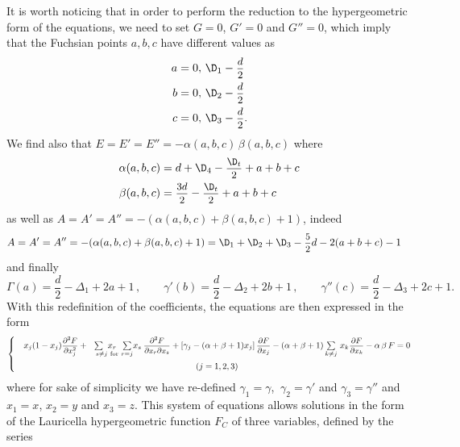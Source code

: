\documentclass[a4paper,11pt,openright,twoside]{book}
\let\a=\alpha   \let\b=\beta   \let\g=\gamma   \let\d=\delta
\newcommand{\sdfrac}[2]{\mbox{\small$\displaystyle\frac{#1}{#2}$}}
\numberwithin{equation}{section}
\begin{document}
{{	It is worth noticing that in order to perform the reduction to the hypergeometric form of the equations, we need to set $G=0$, $G'=0$ and $G''=0$, which imply that the Fuchsian points $a,b,c$ have different values as
	\begin{subequations}
		\begin{align}
			a&=0,\,\D_1-\sdfrac{d}{2}\\
			b&=0,\,\D_2-\sdfrac{d}{2}\\
			c&=0,\,\D_3-\sdfrac{d}{2}.
		\end{align}
	\end{subequations}
	We find also that $E=E'=E''=-\a(a,b,c)\,\b(a,b,c)$ where
	\begin{align}
		\a(a,b,c)&=d+\D_4-\sdfrac{\D_t}{2}+a+b+c\notag\\
		\b(a,b,c)&=\sdfrac{3d}{2}-\sdfrac{\D_t}{2}+a+b+c
	\end{align}
	as well as $A=A'=A''=-(\a(a,b,c)+\b(a,b,c)+1)$, indeed
	\begin{align}
		A=A'=A''&=-(\a(a,b,c)+\b(a,b,c)+1)=\D_1+\D_2+\D_3-\sdfrac{5}{2}d-2(a+b+c)-1
	\end{align}
	and finally
	\begin{equation}
		\Gamma(a)=\frac{d}{2}-\Delta_1+2a+1\,,\qquad\g'(b)=\frac{d}{2}-\Delta_2+2b+1\,,\qquad\g''(c)=\frac{d}{2}-\Delta_3+2c+1.
	\end{equation}
	With this redefinition of the coefficients, the equations are then expressed in the form
	\begin{equation}
		\left\{
		\begin{matrix}
			&x_j(1-x_j)\sdfrac{\partial^2F}{\partial x_j^2}+\hspace{-1cm}\sum\limits_{\substack{\hspace{1.3cm}s\ne j\ \text{for}\ r=j}}\hspace{-1.1cm}x_r\hspace{0.2cm}\sum x_s\hspace{0.5ex}\sdfrac{\partial^2F}{\partial x_r\partial x_s}+\left[\g_j-(\a+\b+1)x_j\right]\sdfrac{\partial F}{\partial x_j}-(\a+\b+1)\sum\limits_{k\ne j}\,x_k\sdfrac{\partial F}{\partial x_k}-\a\,\b\,F=0\\[3ex]
			& (j=1,2,3)
		\end{matrix}\right.\label{systemLauricella}
	\end{equation}
	where for sake of simplicity we have re-defined $\g_1=\g$, $\ \g_2=\g'$ and $\g_3=\g''$ and $x_1=x$, $x_2=y$ and $x_3=z$. 
	This system of equations allows solutions in the form of the Lauricella hypergeometric function $F_C$ of three variables, defined by the series 
}}
\end{document}
